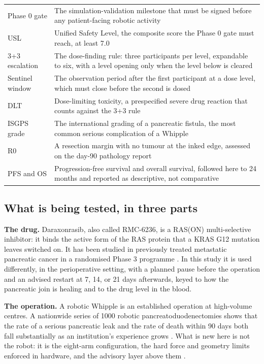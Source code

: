 \begin{xltabular}{\textwidth}{L{3.9cm} Y}
Phase 0 gate & The simulation-validation milestone that must be signed before any patient-facing robotic activity \\
USL & Unified Safety Level, the composite score the Phase 0 gate must reach, at least 7.0 \\
3+3 escalation & The dose-finding rule: three participants per level, expandable to six, with a level opening only when the level below is cleared \\
Sentinel window & The observation period after the first participant at a dose level, which must close before the second is dosed \\
DLT & Dose-limiting toxicity, a prespecified severe drug reaction that counts against the 3+3 rule \\
ISGPS grade & The international grading of a pancreatic fistula, the most common serious complication of a Whipple \\
R0 & A resection margin with no tumour at the inked edge, assessed on the day-90 pathology report \\
PFS and OS & Progression-free survival and overall survival, followed here to 24 months and reported as descriptive, not comparative \\
\end{xltabular}

\vspace{0.30em}

\subsection{What is being tested, in three parts}

\textbf{The drug.} Daraxonrasib, also called RMC-6236, is a RAS(ON)
multi-selective inhibitor: it binds the active form of the RAS protein that a
KRAS G12 mutation leaves switched on. It has been studied in previously treated
metastatic pancreatic cancer in a randomised Phase 3 programme
\cite{rasolute302, oreilly2026darax}. In this study it is used differently, in
the perioperative setting, with a planned pause before the operation and an
advised restart at 7, 14, or 21 days afterwards, keyed to how the pancreatic
join is healing and to the drug level in the blood.

\textbf{The operation.} A robotic Whipple is an established operation at
high-volume centres. A nationwide series of 1000 robotic
pancreatoduodenectomies shows that the rate of a serious pancreatic leak and the
rate of death within 90 days both fall substantially as an institution's
experience grows \cite{DutchCohort2025}. What is new here is not the robot: it
is the eight-arm configuration, the hard force and geometry limits enforced in
hardware, and the advisory layer above them \cite{onpremwhippl}.


